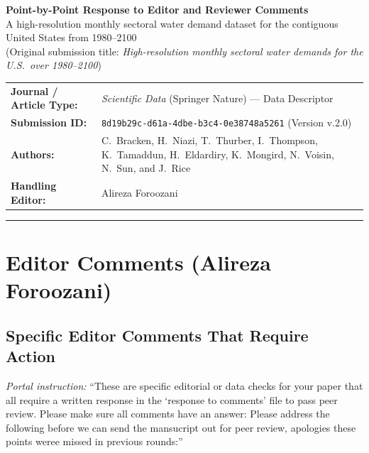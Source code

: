 \documentclass[11pt,letterpaper]{article}
\begin{document}
{\LARGE\bfseries\color{NavyBlue} Point-by-Point Response to Editor and Reviewer Comments}\\[4pt]
{\large A high-resolution monthly sectoral water demand dataset for the contiguous United States from 1980--2100}\\[2pt]
{\small\color{MutedGray} (Original submission title: \textit{High-resolution monthly sectoral water demands for the U.S.\ over 1980--2100})}

\medskip
\begin{tabular}{@{}lp{4.4in}@{}}
\toprule
\textbf{Journal / Article Type:} & \textit{Scientific Data} (Springer Nature) --- Data Descriptor \\
\textbf{Submission ID:}          & \texttt{8d19b29c-d61a-4dbe-b3c4-0e38748a5261} (Version v.2.0) \\
\textbf{Authors:}                & C.~Bracken, H.~Niazi, T.~Thurber, I.~Thompson, K.~Tamaddun, H.~Eldardiry, K.~Mongird, N.~Voisin, N.~Sun, and J.~Rice \\
\textbf{Handling Editor:}        & Alireza Foroozani \\
\bottomrule
\end{tabular}

\medskip
\tableofcontents
\bigskip
\hrule
\bigskip

\section{Editor Comments (Alireza Foroozani)}

\subsection{Specific Editor Comments That Require Action}

{\small\color{MutedGray}\textit{Portal instruction:} ``These are specific editorial or data checks for your paper that all require a written response in the `response to comments' file to pass peer review. Please make sure all comments have an answer: Please address the following before we can send the mansucript out for peer review, apologies these points weree missed in previous rounds:''}
\end{document}
